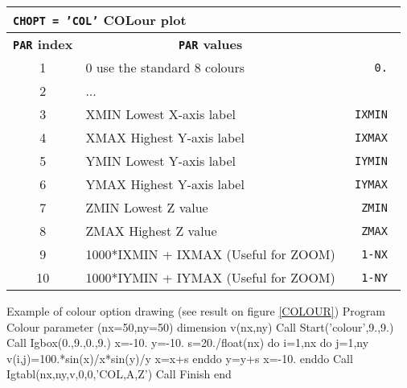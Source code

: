 \begin{center}
\begin{tabular}{||c|p{11cm}|>{\tt}r||}
\hline
\multicolumn{3}{||l||}{\bf {\tt CHOPT = 'COL'} COLour plot}    \\
\hline
\multicolumn{1}{||c|}{\bf {\tt PAR} index}           &
\multicolumn{1}{c|}{\bf {\tt PAR} values}            &
\multicolumn{1}{c||}{\bf default}                              \\
\hline
1  & 0 use the standard 8 colours                                   &   0.    \\
2  & ...                                                            &         \\
3  & XMIN Lowest X-axis label                                       &   IXMIN \\
4  & XMAX Highest Y-axis label                                      &   IXMAX \\
5  & YMIN Lowest Y-axis label                                       &   IYMIN \\
6  & YMAX Highest Y-axis label                                      &   IYMAX \\
7  & ZMIN Lowest Z value                                            &   ZMIN  \\
8  & ZMAX Highest Z value                                           &   ZMAX  \\
9  & 1000*IXMIN + IXMAX (Useful for ZOOM)                           &   1-NX  \\
10 & 1000*IYMIN + IYMAX (Useful for ZOOM)                           &   1-NY  \\
\hline
\end{tabular}
\end{center}

\bigskip

\begin{XMPt}{Example of colour option drawing 
             (see result on figure \ref{COLOUR})}
      Program Colour
      parameter (nx=50,ny=50)
      dimension v(nx,ny)
      Call Start('colour',9.,9.)
      Call Igbox(0.,9.,0.,9.)
      x=-10.
      y=-10.
      s=20./float(nx)
      do i=1,nx
         do j=1,ny
            v(i,j)=100.*sin(x)/x*sin(y)/y
            x=x+s
         enddo
         y=y+s
         x=-10.
      enddo
      Call Igtabl(nx,ny,v,0,0,'COL,A,Z')
      Call Finish
      end
\end{XMPt}

\vfill
\clearpage


